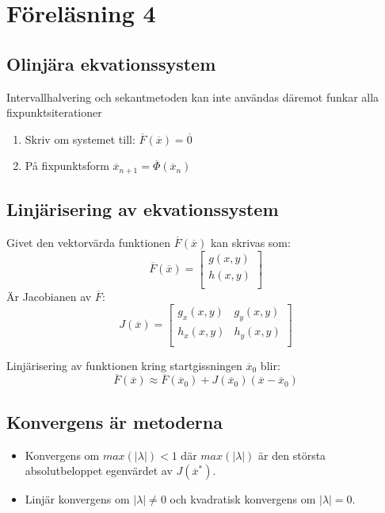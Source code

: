 \documentclass[a4paper,11pt]{article}
\begin{document}
\section{Föreläsning 4}
\subsection{Olinjära ekvationssystem}
Intervallhalvering och sekantmetoden kan inte användas däremot funkar alla fixpunktsiterationer
\begin{enumerate}
    \item Skriv om systemet till: $\overline{F}(\overline{x}) = \overline{0}$
    \item På fixpunktsform $\overline{x}_{n+1} = \overline{\Phi}(\overline{x}_n)$
\end{enumerate}

\newpage
\subsection{Linjärisering av ekvationssystem}
Givet den vektorvärda funktionen $\overline{F}(\overline{x})$ kan skrivas som:
\[ \overline{F}(\overline{x}) = 
\begin{bmatrix}
g(x, y) \\
h(x, y) \\
\end{bmatrix}
\]
Är Jacobianen av $\overline{F}$:
\[
J(\overline{x}) = \begin{bmatrix}
g_x(x, y) & g_y(x, y) \\
h_x(x, y) & h_y(x, y) \\
\end{bmatrix}
\]

Linjärisering av funktionen kring startgissningen $\overline{x}_0$ blir:
\[
\overline{F}(\overline{x}) \approx \overline{F}(\overline{x}_0) + J(\overline{x}_0)(\overline{x} - \overline{x}_0)
\]

\subsection{Konvergens är metoderna}
\begin{itemize}
    \item Konvergens om $max(|\lambda|) < 1$ där $max(|\lambda|)$ är den största absolutbeloppet egenvärdet av $J(\overline{x}^*)$.
    \item Linjär konvergens om $|\lambda| \neq 0$ och kvadratisk konvergens om $|\lambda| = 0$.
\end{itemize}
\end{document}
